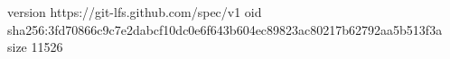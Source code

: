 version https://git-lfs.github.com/spec/v1
oid sha256:3fd70866c9c7e2dabcf10dc0e6f643b604ec89823ac80217b62792aa5b513f3a
size 11526
